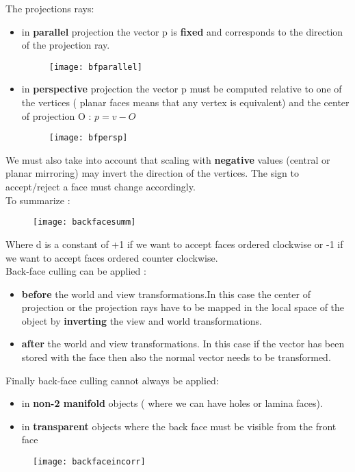 The projections rays:
\begin{itemize}
\item in \textbf{parallel} projection the vector p is \textbf{fixed} and corresponds to the direction of the projection ray.
\begin{figure}[H]
  \centering
  \texttt{[image: bfparallel]}
\end{figure}
\item in \textbf{perspective} projection the vector p must be computed relative to one of the vertices ( planar faces means that any vertex is equivalent) and the center of projection O : $p= v-O$
\begin{figure}[H]
  \centering
  \texttt{[image: bfpersp]}
\end{figure}
\end{itemize}
We must also take into account that scaling with \textbf{negative} values (central or planar mirroring) may invert the direction of the vertices. The sign to accept/reject a face must change accordingly.\\
To summarize :
\begin{figure}[H]
  \centering
  \texttt{[image: backfacesumm]}
\end{figure}
Where d is a constant of +1 if we want to accept faces ordered clockwise or -1 if we want to accept faces ordered counter clockwise.\\
Back-face culling can be applied :
\begin{itemize}
\item \textbf{before} the world and view transformations.In this case the center of projection or the projection rays have to be mapped in the local space of the object by \textbf{inverting} the view and world transformations.
\item \textbf{after} the world and view transformations. In this case if the vector has been stored with the face then also the normal vector needs to be transformed.
\end{itemize}
Finally back-face culling cannot always be applied:
\begin{itemize}
\item in \textbf{non-2 manifold} objects ( where we can have holes or lamina faces). 
\item in \textbf{transparent} objects where the back face must be visible from the front face
\end{itemize} 
\begin{figure}[H]
  \centering
  \texttt{[image: backfaceincorr]}
\end{figure}
